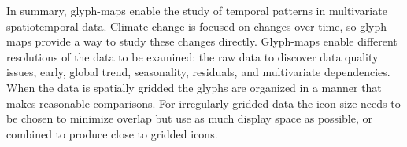 \documentclass[oneside]{article}
\begin{document}
In summary, glyph-maps enable the study of temporal patterns in multivariate spatiotemporal data. Climate change is focused on changes over time, so glyph-maps provide a way to study these changes directly. Glyph-maps enable different resolutions of the data to be examined: the raw data to discover data quality issues, early, global trend, seasonality, residuals, and multivariate dependencies. When the data is spatially gridded the glyphs are organized in a manner that makes reasonable comparisons. For irregularly gridded data the icon size needs to be chosen to minimize overlap but use as much display space as possible, or combined to produce close to gridded icons. 




\end{document}
